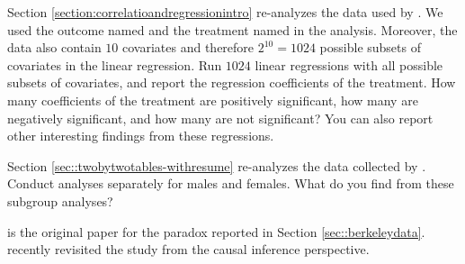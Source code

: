 \begin{HomeworkProblem}\label{exr:1-4}

Section \ref{section:correlatioandregressionintro} re-analyzes the data used by \citet{hainmueller2012entropy}. We used the outcome named  and the treatment named  in the analysis. Moreover, the data also contain $10$ covariates and therefore $2^{10} = 1024$ possible subsets of covariates in the linear regression. Run $1024$ linear regressions with all possible subsets of covariates, and report the regression coefficients of the treatment. How many coefficients of the treatment are positively significant, how many are negatively significant, and how many are not significant? You can also report other interesting findings from these regressions.


\end{HomeworkProblem}

\begin{HomeworkProblem}\label{exr:1-5}

Section \ref{sec::twobytwotables-withresume} re-analyzes the data collected by \citet{bertrand2004emily}. Conduct analyses separately for males and females. What do you find from these subgroup analyses?


\end{HomeworkProblem}

\begin{HomeworkProblem}\label{exr:1-6}

\citet{bickel1975sex} is the original paper for the paradox reported in Section \ref{sec::berkeleydata}.
\citet{pearl2018book} recently revisited the study from the causal inference perspective.



\end{HomeworkProblem}
